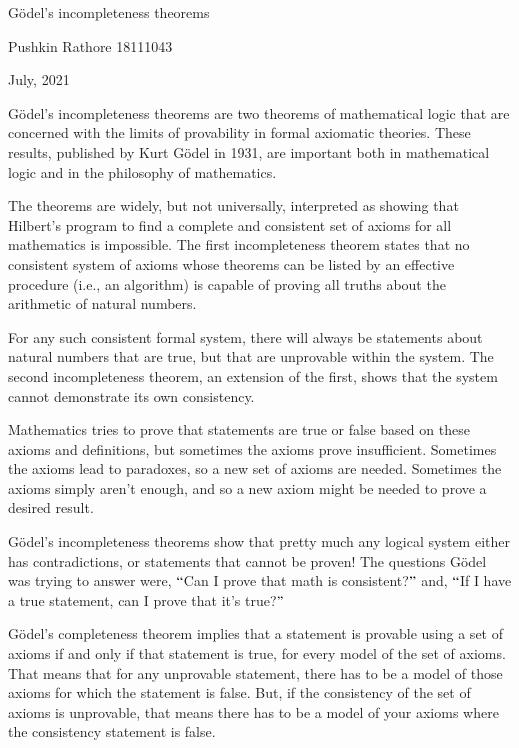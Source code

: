 \documentclass[11pt]{article}
\begin{document}
\begin{center}
{\huge Gödel's incompleteness theorems}
\end{center}


\begin{center}
{\large Pushkin Rathore 18111043}
\end{center}


\begin{center}
{\large July, 2021}
\end{center}


{\Large Gödel's incompleteness theorems are two theorems of mathematical logic that are concerned with the limits of provability in formal axiomatic theories. These results, published by Kurt Gödel in 1931, are important both in mathematical logic and in the philosophy of mathematics.\par}

{\Large  The theorems are widely, but not universally, interpreted as showing that Hilbert's program to find a complete and consistent set of axioms for all mathematics is impossible. The first incompleteness theorem states that no consistent system of axioms whose theorems can be listed by an effective procedure (i.e., an algorithm) is capable of proving all truths about the arithmetic of natural numbers.\par}

{\Large  For any such consistent formal system, there will always be statements about natural numbers that are true, but that are unprovable within the system. The second incompleteness theorem, an extension of the first, shows that the system cannot demonstrate its own consistency. \par}

{\Large Mathematics tries to prove that statements are true or false based on these axioms and definitions, but sometimes the axioms prove insufficient. Sometimes the axioms lead to paradoxes, so a new set of axioms are needed. Sometimes the axioms simply aren’t enough, and so a new axiom might be needed to prove a desired result.\par}

{\Large  Gödel’s incompleteness theorems show that pretty much any logical system either has contradictions, or statements that cannot be proven! The questions Gödel was trying to answer were, $``$Can I prove that math is consistent?$"$ and, $``$If I have a true statement, can I prove that it’s true?$"$\par}

{\Large Gödel’s completeness theorem implies that a statement is provable using a set of axioms if and only if that statement is true, for every model of the set of axioms. That means that for any unprovable statement, there has to be a model of those axioms for which the statement is false. But, if the consistency of the set of axioms is unprovable, that means there has to be a model of your axioms where the consistency statement is false.\par}
\end{document}
